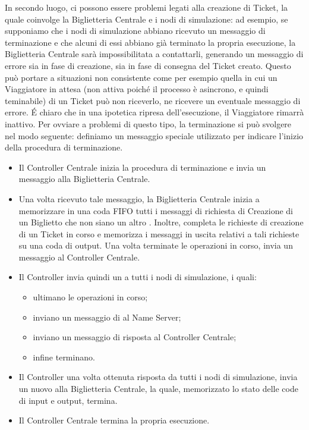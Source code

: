 	In secondo luogo, ci possono essere problemi legati alla creazione di Ticket, la quale coinvolge la Biglietteria Centrale e i nodi di simulazione: ad esempio, se supponiamo che i nodi di simulazione abbiano ricevuto un messaggio di terminazione e che alcuni di essi abbiano già terminato la propria esecuzione, la Biglietteria Centrale sarà impossibilitata a contattarli, generando un messaggio di errore sia in fase di creazione, sia in fase di consegna del Ticket creato. Questo può portare a situazioni non consistente come per esempio quella in cui un Viaggiatore in attesa (non attiva poiché il processo è asincrono, e quindi teminabile) di un Ticket può non riceverlo, ne ricevere un eventuale messaggio di errore. \'E chiaro che in una ipotetica ripresa dell'esecuzione, il Viaggiatore rimarrà inattivo.
	Per ovviare a problemi di questo tipo, la terminazione si può svolgere nel modo seguente: definiamo  un messaggio speciale utilizzato per indicare l'inizio della procedura di terminazione. 
	\begin{itemize}
		\item Il Controller Centrale inizia la procedura di terminazione e invia un messaggio  alla Biglietteria Centrale.
		\item Una volta ricevuto tale messaggio, la Biglietteria Centrale inizia a memorizzare in una coda FIFO tutti i messaggi di richiesta di Creazione di un Biglietto che non siano un altro . Inoltre, completa le richieste di creazione di un Ticket in corso e memorizza i messaggi in uscita relativi a tali richieste su una coda di output. Una volta terminate le operazioni in corso, invia un messaggio  al Controller Centrale.
		\item Il Controller invia quindi un  a tutti i nodi di simulazione, i quali:
			\begin{itemize}
				\item ultimano le operazioni in corso;
				\item inviano un messaggio di  al Name Server;
				\item inviano un messaggio di risposta al Controller Centrale;
				\item infine terminano.
			\end{itemize}
		\item Il Controller una volta ottenuta risposta da tutti i nodi di simulazione, invia un nuovo  alla Biglietteria Centrale, la quale, memorizzato lo stato delle code di input e output, termina.
		\item Il Controller Centrale termina la propria esecuzione.
	\end{itemize}
